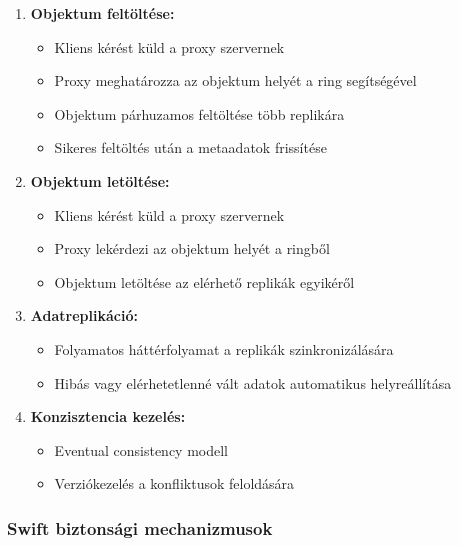 \documentclass[a4paper,12pt]{article}
\begin{document}
    \begin{enumerate}
        \item \textbf{Objektum feltöltése:}
        \begin{itemize}
            \item Kliens kérést küld a proxy szervernek
            \item Proxy meghatározza az objektum helyét a ring segítségével
            \item Objektum párhuzamos feltöltése több replikára
            \item Sikeres feltöltés után a metaadatok frissítése
        \end{itemize}

        \item \textbf{Objektum letöltése:}
        \begin{itemize}
            \item Kliens kérést küld a proxy szervernek
            \item Proxy lekérdezi az objektum helyét a ringből
            \item Objektum letöltése az elérhető replikák egyikéről
        \end{itemize}

        \item \textbf{Adatreplikáció:}
        \begin{itemize}
            \item Folyamatos háttérfolyamat a replikák szinkronizálására
            \item Hibás vagy elérhetetlenné vált adatok automatikus helyreállítása
        \end{itemize}

        \item \textbf{Konzisztencia kezelés:}
        \begin{itemize}
            \item Eventual consistency modell
            \item Verziókezelés a konfliktusok feloldására
        \end{itemize}
    \end{enumerate}

    \subsubsection{Swift biztonsági mechanizmusok}
\end{document}
